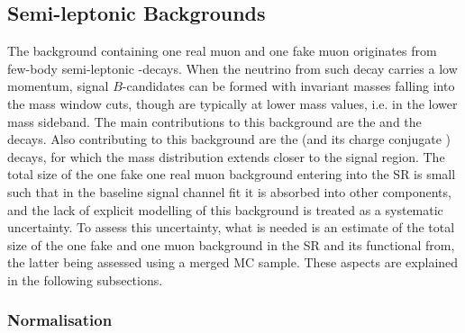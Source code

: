 \subsection{Semi-leptonic Backgrounds}
\label{subsec:SemilepBkg}

The background containing one real muon and one fake muon originates from few-body semi-leptonic \B-decays.
When the neutrino from such decay carries a low momentum, signal $B$-candidates can be formed with invariant masses falling into the mass window cuts, though are typically at lower mass values, i.e. in the lower mass sideband. 
The main contributions to this background are the \BdPiMuNu and the \BsKMuNu decays. 
Also contributing to this background are the \LPMuNu (and its charge conjugate \AntiLPMuNu) decays, for which the mass distribution extends closer to the signal region. 
The total size of the one fake one real muon background entering into the SR is small such that in the baseline signal channel fit it is absorbed into other components, and the lack of explicit modelling of this background is treated as a systematic uncertainty. 
To assess this uncertainty, what is needed is an estimate of the total size of the one fake and one muon background in the SR and its functional from, the latter being assessed using a merged MC sample.  
These aspects are explained in the following subsections. 

\subsubsection{Normalisation}
\label{subsec:SemiLepNormalisation}

